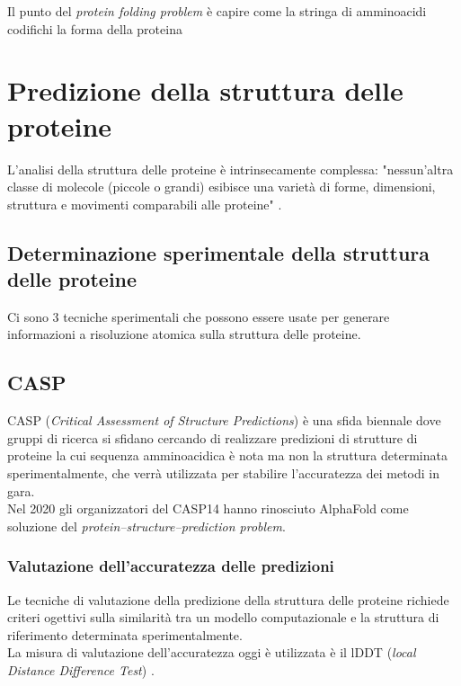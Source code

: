 Il punto del \textit{protein folding problem }è capire come la stringa di amminoacidi codifichi la forma della proteina

\chapter{Predizione della struttura delle proteine}
L'analisi della struttura delle proteine è intrinsecamente complessa: "nessun'altra classe di molecole (piccole o grandi) esibisce una varietà di forme, dimensioni, struttura e movimenti comparabili alle proteine"  \parencite{baxevanis2020bioinformatics}.

\section{Determinazione sperimentale della struttura delle proteine}

Ci sono 3 tecniche sperimentali che possono essere usate per generare informazioni a risoluzione atomica sulla struttura delle proteine.

\section{CASP}
CASP (\textit{Critical Assessment of Structure Predictions}) è una sfida biennale dove gruppi di ricerca si sfidano cercando di realizzare predizioni di strutture di proteine la cui sequenza amminoacidica è nota ma non la struttura determinata sperimentalmente, che verrà utilizzata per stabilire l'accuratezza dei metodi in gara. \\

Nel 2020 gli organizzatori del CASP14 hanno rinosciuto AlphaFold come soluzione del \textit{protein–structure–prediction problem}. \\

\subsection{Valutazione dell'accuratezza delle predizioni}

Le tecniche di valutazione della predizione della struttura delle proteine richiede criteri ogettivi sulla similarità tra un modello computazionale e la struttura di riferimento determinata sperimentalmente.\\

La misura di valutazione dell'accuratezza oggi è utilizzata è il lDDT (\textit{local Distance
	Difference Test}) \cite{mariani2013lddt}. \\

